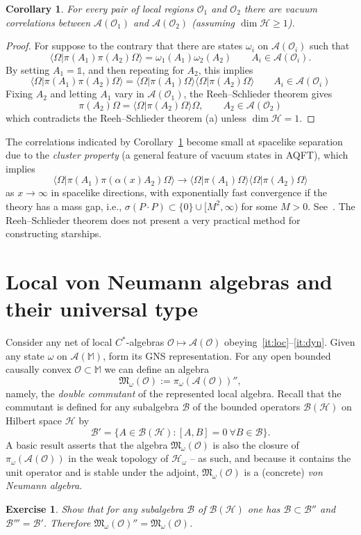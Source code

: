 \documentclass[12pt]{article}
\newcommand{\1}{\mathds{1}}                         %
\newcommand{\Ocal}{\mathcal{O}}
\newcommand{\MM}{\mathbb{M}}
\newcommand{\BB}{{\mathcal{B}}}
\newcommand{\HH}{{\mathcal{H}}}
\newcommand{\Mf}{{\mathfrak{M}}}
\newcommand{\II}{{\mathbb{1}}}
\newcommand{\Ac}{{\mathcal{A}}}
\newcommand{\Bc}{{\mathcal{B}}}
\newcommand{\ip}[2]{\langle #1|#2\rangle}
\newtheorem{corollary}[theorem]{Corollary}
\newtheorem{exercise}[theorem]{Exercise}
\begin{document}
\begin{corollary}\label{cor:vaccor}
For every pair of local regions $\Ocal_1$ and $\Ocal_2$ there are vacuum correlations between $\Ac(\Ocal_1)$ and $\Ac(\Ocal_2)$ (assuming $\dim \HH\ge 1$).
\end{corollary}
\begin{proof}
	For suppose to the contrary that there are states $\omega_i$ on $\Ac(\Ocal_i)$ such that 
	\[
	\ip{\Omega}{\pi(A_1)\pi(A_2)\Omega} = \omega_1(A_1)\omega_2(A_2)\qquad A_i\in\Ac(\Ocal_i).
	\]
	By setting $A_1=\II$, and then repeating for $A_2$, this implies 
	\[
	\ip{\Omega}{\pi(A_1)\pi(A_2)\Omega} = 	\ip{\Omega}{\pi(A_1) \Omega}	\ip{\Omega}{ \pi(A_2)\Omega}\qquad A_i\in\Ac(\Ocal_i)
	\] 
	Fixing $A_2$ and letting $A_1$ vary in $\Ac(\Ocal_1)$, the Reeh--Schlieder theorem gives
	\[
	\pi(A_2)\Omega = \ip{\Omega}{ \pi(A_2)\Omega}\Omega,\qquad A_2\in\Ac(\Ocal_2)
	\]
	which contradicts the Reeh--Schlieder theorem (a) unless $\dim\HH=1$. 
\end{proof}
The correlations indicated by Corollary~\ref{cor:vaccor} become small at spacelike separation due to the
\emph{cluster property} (a general feature of vacuum states in AQFT), which implies 
\[
\ip{\Omega}{\pi(A_1)\pi(\alpha(x)A_2)\Omega} \to	\ip{\Omega}{\pi(A_1) \Omega}	\ip{\Omega}{ \pi(A_2)\Omega}
\]
as $x\to\infty$ in spacelike directions, with exponentially fast convergence if the theory has a mass gap, i.e., $\sigma(P\cdot P)\subset\{0\}\cup[M^2,\infty)$ for some $M>0$. See~\cite[\S 4.3-4.4]{Araki}. The Reeh--Schlieder theorem does not present a very practical method for constructing starships.

\section{Local von Neumann algebras and their universal type} \label{sec:universaltype}

Consider any net of local $C^*$-algebras $\Ocal\mapsto\Ac(\Ocal)$ obeying~\ref{it:loc}--\ref{it:dyn}.
Given any state $\omega$ on $\Ac(\MM)$, form its GNS representation. For any open bounded causally convex $\Ocal\subset\MM$ we can define an algebra
\[
\Mf_\omega(\Ocal) := \pi_\omega(\Ac(\Ocal))'',
\]
namely, the \emph{double commutant} of the represented local algebra. Recall that
the commutant is defined for any subalgebra $\Bc$ of the bounded operators $\BB(\HH)$ on Hilbert space $\HH$ by 
\[
\Bc' = \{A\in\BB(\HH): [A,B]=0~\forall B\in\Bc\}.
\]
A basic result asserts that the algebra $\Mf_\omega(\Ocal)$ is also the closure of $\pi_\omega(\Ac(\Ocal))$ in the weak topology of $\HH_\omega$ -- as such, and because it contains the unit operator and is stable under the adjoint, $\Mf_\omega(\Ocal)$ is a (concrete) \emph{von Neumann algebra}. 
\begin{exercise}
	Show that for any subalgebra $\Bc$ of $\Bc(\HH)$ one has $\Bc\subset \Bc''$ and $\Bc'''=\Bc'$.
	Therefore $\Mf_\omega(\Ocal)''=\Mf_\omega(\Ocal)$. 
\end{exercise}
\end{document}
